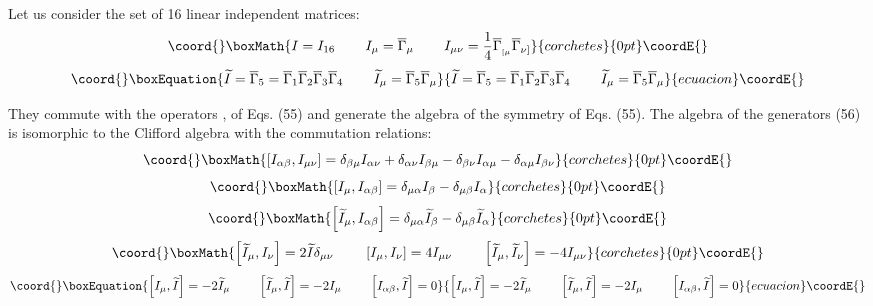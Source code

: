 \documentclass[a4paper,12pt]{article}
\begin{document}
Let us consider the set of 16 linear independent matrices:
\[\coord{}\boxMath{
I=I_{16}\hspace{0.3in}I_\mu =\overline{\Gamma }_\mu \hspace{0.3in}
I_{\mu \nu }=\frac 14\overline{\Gamma }_{_{[\mu }}\overline{\Gamma
} _{\nu ]}
}{corchetes}{0pt}\coordE{}\]
\begin{equation}\coord{}\boxEquation{
\widetilde{I}=\overline{\Gamma }_5=\overline{\Gamma
}_1\overline{\Gamma }_2 \overline{\Gamma }_3\overline{\Gamma
}_4\hspace{0.3in}\widetilde{I} _\mu =\overline{\Gamma
}_5\overline{\Gamma }_\mu  \label{56}
}{
\widetilde{I}=\overline{\Gamma }_5=\overline{\Gamma
}_1\overline{\Gamma }_2 \overline{\Gamma }_3\overline{\Gamma
}_4\hspace{0.3in}\widetilde{I} _\mu =\overline{\Gamma
}_5\overline{\Gamma }_\mu  }{ecuacion}\coordE{}\end{equation}

They commute with the operators \coordHE{},
\coordHE{} of Eqs. (55) and
generate the algebra of the symmetry of Eqs. (55). The algebra of the
generators (56) is isomorphic to the Clifford algebra with the commutation
relations:
\[\coord{}\boxMath{
\left[ I_{\alpha \beta },I_{\mu \nu }\right] =\delta _{\beta \mu }I_{\alpha
\nu }+\delta _{\alpha \nu }I_{\beta \mu }-\delta _{\beta \nu }I_{\alpha \mu
}-\delta _{\alpha \mu }I_{\beta \nu }
}{corchetes}{0pt}\coordE{}\]
\[\coord{}\boxMath{
\left[ I_\mu ,I_{\alpha \beta }\right] =\delta _{\mu \alpha }I_\beta -\delta
_{\mu \beta }I_\alpha
}{corchetes}{0pt}\coordE{}\]
\[\coord{}\boxMath{
\left[ \widetilde{I}_\mu ,I_{\alpha \beta }\right] =\delta _{\mu
\alpha } \widetilde{I}_\beta -\delta _{\mu \beta
}\widetilde{I}_\alpha
}{corchetes}{0pt}\coordE{}\]
\[\coord{}\boxMath{
\left[ \widetilde{I}_\mu ,I_\nu \right] =2\widetilde{I}\delta
_{\mu \nu } \hspace{0.3in}\left[ I_\mu ,I_\nu \right] =4I_{\mu \nu
}\hspace{0.3in}\left[ \widetilde{I}_\mu ,\widetilde{I}_\nu \right]
=-4I_{\mu \nu }
}{corchetes}{0pt}\coordE{}\]
\begin{equation}\coord{}\boxEquation{
\left[ I_\mu ,\widetilde{I}\right] =-2\widetilde{I}_\mu \hspace{0.3in}\left[
\widetilde{I}_\mu ,\widetilde{I}\right] =-2I_\mu \hspace{0.3in}\left[
I_{\alpha \beta },\widetilde{I}\right] =0  \label{57}
}{
\left[ I_\mu ,\widetilde{I}\right] =-2\widetilde{I}_\mu \hspace{0.3in}\left[
\widetilde{I}_\mu ,\widetilde{I}\right] =-2I_\mu \hspace{0.3in}\left[
I_{\alpha \beta },\widetilde{I}\right] =0  }{ecuacion}\coordE{}\end{equation}
\end{document}

